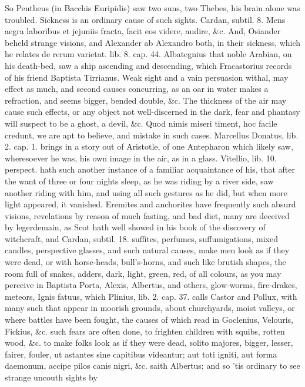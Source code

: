 {So Pentheus (in Bacchis Euripidis) saw two suns, two Thebes, his brain
alone was troubled. Sickness is an ordinary cause of such sights.
Cardan, subtil. 8. Mens aegra laboribus et jejuniis fracta, facit eos
videre, audire, \&c. And, Osiander beheld strange visions, and Alexander
ab Alexandro both, in their sickness, which he relates de rerum
varietat. lib. 8. cap. 44. Albategnius that noble Arabian, on his
death-bed, saw a ship ascending and descending, which Fracastorius
records of his friend Baptista Tirrianus. Weak sight and a vain
persuasion withal, may effect as much, and second causes concurring, as
an oar in water makes a refraction, and seems bigger, bended double,
\&c. The thickness of the air may cause such effects, or any object not
well-discerned in the dark, fear and phantasy will suspect to be a
ghost, a devil, \&c. Quod nimis miseri timent, hoc facile credunt,
we are apt to believe, and mistake in such cases. Marcellus Donatus,
lib. 2. cap. 1. brings in a story out of Aristotle, of one Antepharon
which likely saw, wheresoever he was, his own image in the air, as in a
glass. Vitellio, lib. 10. perspect. hath such another instance of a
familiar acquaintance of his, that after the want of three or four
nights sleep, as he was riding by a river side, saw another riding with
him, and using all such gestures as he did, but when more light
appeared, it vanished. Eremites and anchorites have frequently such
absurd visions, revelations by reason of much fasting, and bad diet,
many are deceived by legerdemain, as Scot hath well showed in his book
of the discovery of witchcraft, and Cardan, subtil. 18. suffites,
perfumes, suffumigations, mixed candles, perspective glasses, and such
natural causes, make men look as if they were dead, or with
horse-heads, bull's-horns, and such like brutish shapes, the room full
of snakes, adders, dark, light, green, red, of all colours, as you may
perceive in Baptista Porta, Alexis, Albertus, and others, glow-worms,
fire-drakes, meteors, Ignis fatuus, which Plinius, lib. 2. cap. 37.
calls Castor and Pollux, with many such that appear in moorish grounds,
about churchyards, moist valleys, or where battles have been fought,
the causes of which read in Goclenius, Velouris, Fickius, \&c. such
fears are often done, to frighten children with squibs, rotten wood,
\&c. to make folks look as if they were dead, solito majores,
bigger, lesser, fairer, fouler, ut astantes sine capitibus videantur;
aut toti igniti, aut forma daemonum, accipe pilos canis nigri, \&c.
saith Albertus; and so 'tis ordinary to see strange uncouth sights by
}
